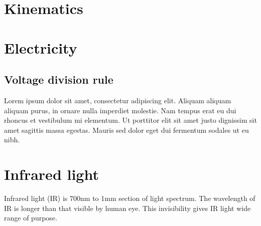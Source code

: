 \documentclass[11pt,a4paper,oneside,article]{memoir}
\begin{document}
\section{Kinematics}

\section{Electricity}
\subsection{Voltage division rule}
Lorem ipsum dolor sit amet, consectetur adipiscing elit. Aliquam aliquam aliquam purus, in ornare nulla imperdiet molestie. Nam tempus erat eu dui rhoncus et vestibulum mi elementum. Ut porttitor elit sit amet justo dignissim sit amet sagittis massa egestas. Mauris sed dolor eget dui fermentum sodales ut eu nibh.

\section{Infrared light}
Infrared light (IR) is 700nm to 1mm section of light spectrum. The wavelength of IR is longer than that visible by human eye. This invisibility gives IR light wide range of purpose.




\end{document}
